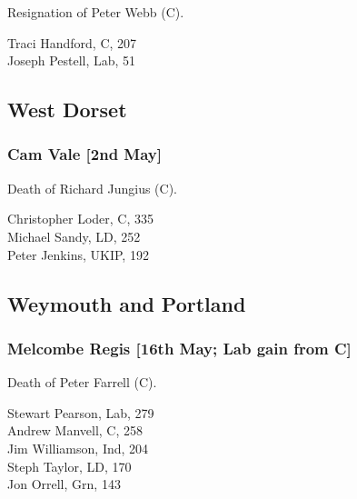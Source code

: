 \documentclass[a4paper,openany,10pt]{book}
\begin{document}

Resignation of Peter Webb (C).



Traci Handford, C, 207\\
Joseph Pestell, Lab, 51\\


\subsection*{West Dorset}

\subsubsection*{Cam Vale \hspace*{\fill}\nolinebreak[1]%
\enspace\hspace*{\fill}
[2nd May]}


Death of Richard Jungius (C).



Christopher Loder, C, 335\\
Michael Sandy, LD, 252\\
Peter Jenkins, UKIP, 192\\


\subsection*{Weymouth and Portland}

\subsubsection*{Melcombe Regis \hspace*{\fill}\nolinebreak[1]%
\enspace\hspace*{\fill}
[16th May; Lab gain from C]}


Death of Peter Farrell (C).



Stewart Pearson, Lab, 279\\
Andrew Manvell, C, 258\\
Jim Williamson, Ind, 204\\
Steph Taylor, LD, 170\\
Jon Orrell, Grn, 143\\
\end{document}
